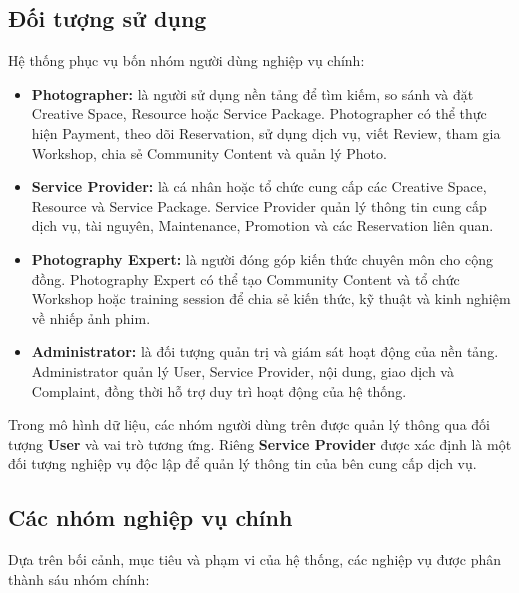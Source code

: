 \subsection{Đối tượng sử dụng}

Hệ thống phục vụ bốn nhóm người dùng nghiệp vụ chính:

\begin{itemize}
	\item \textbf{Photographer:} là người sử dụng nền tảng để tìm kiếm, so sánh và đặt Creative Space, Resource hoặc Service Package. Photographer có thể thực hiện Payment, theo dõi Reservation, sử dụng dịch vụ, viết Review, tham gia Workshop, chia sẻ Community Content và quản lý Photo.
	
	\item \textbf{Service Provider:} là cá nhân hoặc tổ chức cung cấp các Creative Space, Resource và Service Package. Service Provider quản lý thông tin cung cấp dịch vụ, tài nguyên, Maintenance, Promotion và các Reservation liên quan.
	
	\item \textbf{Photography Expert:} là người đóng góp kiến thức chuyên môn cho cộng đồng. Photography Expert có thể tạo Community Content và tổ chức Workshop hoặc training session để chia sẻ kiến thức, kỹ thuật và kinh nghiệm về nhiếp ảnh phim.
	
	\item \textbf{Administrator:} là đối tượng quản trị và giám sát hoạt động của nền tảng. Administrator quản lý User, Service Provider, nội dung, giao dịch và Complaint, đồng thời hỗ trợ duy trì hoạt động của hệ thống.
\end{itemize}

Trong mô hình dữ liệu, các nhóm người dùng trên được quản lý thông qua đối tượng \textbf{User} và vai trò tương ứng. Riêng \textbf{Service Provider} được xác định là một đối tượng nghiệp vụ độc lập để quản lý thông tin của bên cung cấp dịch vụ.

\subsection{Các nhóm nghiệp vụ chính}

Dựa trên bối cảnh, mục tiêu và phạm vi của hệ thống, các nghiệp vụ được phân thành sáu nhóm chính:

